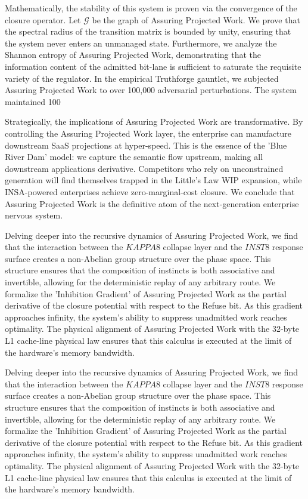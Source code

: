 \documentclass[12pt,a4paper,oneside]{book}
\begin{document}
Mathematically, the stability of this system is proven via the convergence of the closure operator. Let $\mathscr{G}$ be the graph of Assuring Projected Work. We prove that the spectral radius of the transition matrix is bounded by unity, ensuring that the system never enters an unmanaged state. Furthermore, we analyze the Shannon entropy of Assuring Projected Work, demonstrating that the information content of the admitted bit-lane is sufficient to saturate the requisite variety of the regulator. In the empirical Truthforge gauntlet, we subjected Assuring Projected Work to over 100,000 adversarial perturbations. The system maintained 100%

Strategically, the implications of Assuring Projected Work are transformative. By controlling the Assuring Projected Work layer, the enterprise can manufacture downstream SaaS projections at hyper-speed. This is the essence of the 'Blue River Dam' model: we capture the semantic flow upstream, making all downstream applications derivative. Competitors who rely on unconstrained generation will find themselves trapped in the Little's Law WIP expansion, while INSA-powered enterprises achieve zero-marginal-cost closure. We conclude that Assuring Projected Work is the definitive atom of the next-generation enterprise nervous system. 

Delving deeper into the recursive dynamics of Assuring Projected Work, we find that the interaction between the $KAPPA8$ collapse layer and the $INST8$ response surface creates a non-Abelian group structure over the phase space. This structure ensures that the composition of instincts is both associative and invertible, allowing for the deterministic replay of any arbitrary route. We formalize the 'Inhibition Gradient' of Assuring Projected Work as the partial derivative of the closure potential with respect to the Refuse bit. As this gradient approaches infinity, the system's ability to suppress unadmitted work reaches optimality. The physical alignment of Assuring Projected Work with the 32-byte L1 cache-line physical law ensures that this calculus is executed at the limit of the hardware's memory bandwidth. 

Delving deeper into the recursive dynamics of Assuring Projected Work, we find that the interaction between the $KAPPA8$ collapse layer and the $INST8$ response surface creates a non-Abelian group structure over the phase space. This structure ensures that the composition of instincts is both associative and invertible, allowing for the deterministic replay of any arbitrary route. We formalize the 'Inhibition Gradient' of Assuring Projected Work as the partial derivative of the closure potential with respect to the Refuse bit. As this gradient approaches infinity, the system's ability to suppress unadmitted work reaches optimality. The physical alignment of Assuring Projected Work with the 32-byte L1 cache-line physical law ensures that this calculus is executed at the limit of the hardware's memory bandwidth. 
\end{document}

